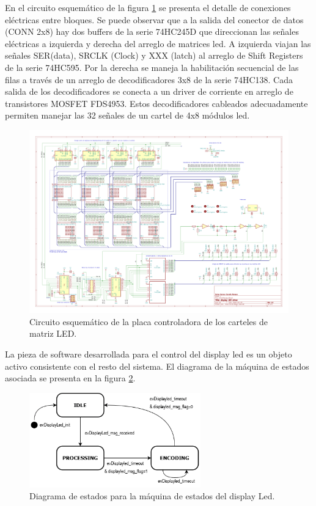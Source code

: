 En el circuito esquemático de la figura \ref{fig:schDriverLED} se presenta el detalle de conexiones eléctricas entre bloques. Se puede observar que a la salida del conector de datos (CONN 2x8) hay dos buffers de la serie 74HC245D que direccionan las señales eléctricas a izquierda y derecha del arreglo de matrices led. A izquierda viajan las señales SER(data), SRCLK (Clock) y XXX (latch) al arreglo de Shift Registers de la serie 74HC595. Por la derecha se maneja la habilitación secuencial de las filas a través de un arreglo de decodificadores 3x8 de la serie 74HC138. Cada salida de los decodificadores se conecta a un driver de corriente en arreglo de transistores MOSFET FDS4953. Estos decodificadores cableados adecuadamente permiten manejar las 32 señales de un cartel de 4x8 módulos led. \\


\begin{figure}[ht]
	\centering
	\includegraphics[width=1.66\textwidth, angle=90]{./Figures/output.driverLED.pdf}
	\caption{Circuito esquemático de la placa controladora de los carteles de matriz LED.}
	\label{fig:schDriverLED}
\end{figure}

La pieza de software desarrollada para el control del display led es un objeto activo consistente con el resto del sistema. El diagrama de la máquina de estados asociada se presenta en la figura \ref{fig:fsmDisplayLED}. \\

\begin{figure}[ht]
	\centering
	\includegraphics[width=0.66\textwidth]{./Figures/FSMdisplayLed.png}
	\caption{Diagrama de estados para la máquina de estados del display Led.}
	\label{fig:fsmDisplayLED}
\end{figure}

